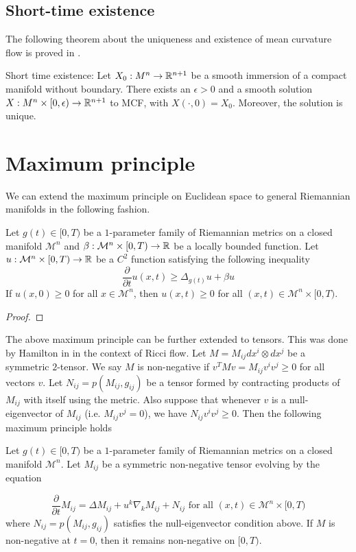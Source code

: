 \subsection{Short-time existence}
The following theorem about the uniqueness and existence of mean curvature flow is proved in \cite{andrews2022extrinsic}. 
\begin{thm}
    Short time existence: Let $ X_{0}: M^{n} \to \mathbb{R}^{n+1} $ be a smooth immersion of a compact manifold without boundary. There exists an $ \epsilon >0 $ and a smooth solution $ X : M^{n} \times [0, \epsilon) \to \mathbb{R}^{n+1}$ to MCF, with $ X( \cdot, 0) = X_{0} $. Moreover, the solution is unique.
\end{thm}

\section{Maximum principle}\label{max}
We can extend the maximum principle on Euclidean space to general Riemannian manifolds in the following fashion. 
\begin{lemma}
    Let $ g(t) \in [0,T) $ be a $ 1 $-parameter family of Riemannian metrics on a closed manifold $ \mathcal{M}^{n} $ and $ \beta : \mathcal{M}^{n} \times [0,T) \to \mathbb{R} $ be a locally bounded function. Let $ u : \mathcal{M}^{n} \times [0,T) \to \mathbb{R}$ be a $ C^{2} $ function satisfying the following inequality 
    \[ \frac{ \partial}{ \partial t}u(x,t) \ge \Delta_{g(t)}u + \beta u\]
    If $ u(x,0) \ge 0 $ for all $ x \in \mathcal{M}^{n}$, then $ u(x,t) \ge 0 $ for all $ (x,t) \in \mathcal{M}^{n} \times [0,T) $.
\end{lemma}

\begin{proof}
    
\end{proof}

The above maximum principle can be further extended to tensors. This was done by Hamilton in \cite{hamilton1982three} in the context of Ricci flow. Let $ M = M_{ij}dx^{i}\otimes dx^{j} $ be a symmetric $ 2 $-tensor. We say $ M $ is non-negative if $ v^{T}Mv = M_{ij}v^{i}v^{j} \ge 0 $ for all vectors $ v $. Let $ N_{ij} = p(M_{ij},g_{ij}) $ be a tensor formed by contracting products of $ M_{ij} $ with itself using the metric. Also suppose that whenever $ v $ is a null-eigenvector of $ M_{ij} $ (i.e. $ M_{ij}v^{j} = 0 $), we have $ N_{ij}v^{i}v^{j} \ge 0 $. Then the following maximum principle holds

\begin{lemma}
	Let $ g(t) \in [0,T)  $ be a $ 1 $-parameter family of Riemannian metrics on a closed manifold $ \mathcal{M}^{n} $. Let $ M_{ij} $ be a symmetric non-negative tensor evolving by the equation 
	
        \[ \frac{ \partial}{ \partial t}M_{ij} = \Delta M_{ij} + u^{k}\nabla_{k}M_{ij}+ N_{ij}  \text{ for all } (x,t) \in  \mathcal{M}^{n} \times [0,T) \]
	where $ N_{ij} = p(M_{ij},g_{ij}) $ satisfies the null-eigenvector condition above. If $ M $ is non-negative at $ t=0 $, then it remains non-negative on $ [0,T) $.
\end{lemma}

